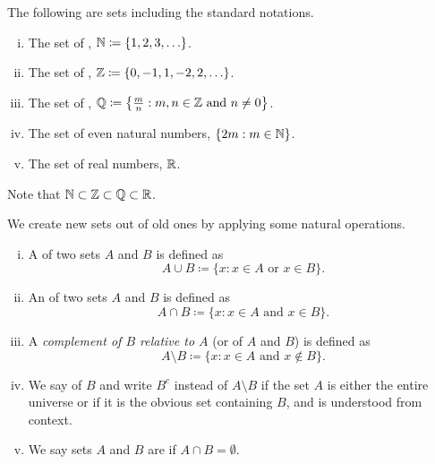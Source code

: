 \begin{example}
The following are sets including the standard notations.
\begin{enumerate}[(i)]
\item The set of \emph{},
${\mathbb{N}} \coloneqq \{ 1, 2, 3, \ldots
\}$.
\item The set of \emph{},
${\mathbb{Z}} \coloneqq \{ 0, -1, 1, -2, 2, \ldots
\}$.
\item The set of \emph{},
${\mathbb{Q}} \coloneqq \bigl\{ \frac{m}{n} :  m, n \in {\mathbb{Z}} \text{ and } n \neq 0 \bigr\}$.
\item The set of even natural numbers, $\{  2m : m \in {\mathbb{N}} \}$.
\item The set of real numbers,
${\mathbb{R}}$.
\end{enumerate}

Note that ${\mathbb{N}} \subset {\mathbb{Z}} \subset {\mathbb{Q}} \subset {\mathbb{R}}$.
\end{example}

We create new sets out of old ones by applying some natural operations.

\begin{defn}
\pagebreak[2]
\leavevmode
\begin{enumerate}[(i)]
\item
A \emph{} of two sets $A$ and $B$ is defined as
\begin{equation*}
A \cup B \coloneqq \{ x : x \in A \text{ or } x \in B \} .
\end{equation*}
\item
An \emph{} of two sets $A$ and $B$ is defined as
\begin{equation*}
A \cap B \coloneqq \{ x : x \in A \text{ and } x \in B \} .
\end{equation*}
\item
A \emph{complement of $B$ relative to $A$}
(or \emph{} of $A$ and $B$) is defined as
\begin{equation*}
A \setminus B \coloneqq \{ x : x \in A \text{ and } x \notin B \} .
\end{equation*}
\item
We say
\emph{} of $B$ and write $B^c$ 
instead of $A \setminus B$ if
the set $A$ is either the entire universe or if it is the obvious
set containing $B$, and is understood from context.
\item
We say sets $A$ and $B$ are \emph{} if $A \cap B =
\emptyset$.
\end{enumerate}
\end{defn}


